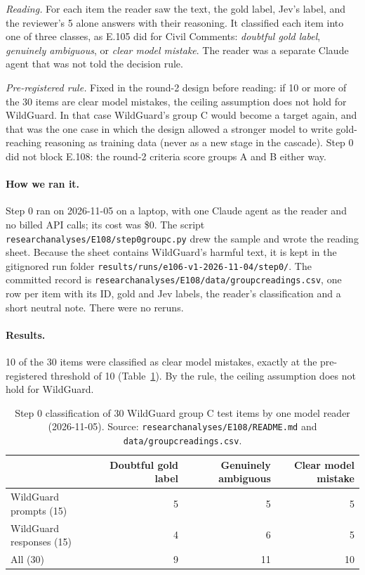 \documentclass[11pt]{article}
\renewcommand{\_}{\origunderscore\allowbreak}
\begin{document}
\emph{Reading.} For each item the reader saw the text, the gold label, Jev's label, and the reviewer's 5 alone answers with their reasoning. It classified each item into one of three classes, as E.105 did for Civil Comments: \emph{doubtful gold label}, \emph{genuinely ambiguous}, or \emph{clear model mistake}. The reader was a separate Claude agent that was not told the decision rule.

\emph{Pre-registered rule.} Fixed in the round-2 design before reading: if 10 or more of the 30 items are clear model mistakes, the ceiling assumption does not hold for WildGuard. In that case WildGuard's group C would become a target again, and that was the one case in which the design allowed a stronger model to write gold-reaching reasoning as training data (never as a new stage in the cascade). Step 0 did not block E.108: the round-2 criteria score groups A and B either way.

\paragraph{How we ran it.}
Step 0 ran on 2026-11-05 on a laptop, with one Claude agent as the reader and no billed API calls; its cost was \$0. The script \texttt{research\_analyses/E108/step0\_group\_c.py} drew the sample and wrote the reading sheet. Because the sheet contains WildGuard's harmful text, it is kept in the gitignored run folder \texttt{results/runs/e106-v1-2026-11-04/step0/}. The committed record is \texttt{research\_analyses/E108/data/group\_c\_readings.csv}, one row per item with its ID, gold and Jev labels, the reader's classification and a short neutral note. There were no reruns.

\paragraph{Results.}
10 of the 30 items were classified as clear model mistakes, exactly at the pre-registered threshold of 10 (Table~\ref{tab:step0-readings}). By the rule, the ceiling assumption does not hold for WildGuard.

\begin{table}[H]
\centering
\small
\caption{Step 0 classification of 30 WildGuard group C test items by one model reader (2026-11-05). Source: \texttt{research\_analyses/E108/README.md} and \texttt{data/group\_c\_readings.csv}.}
\label{tab:step0-readings}
\begin{tabular}{lrrr}
\toprule
 & Doubtful gold label & Genuinely ambiguous & Clear model mistake \\
\midrule
WildGuard prompts (15) & 5 & 5 & 5 \\
WildGuard responses (15) & 4 & 6 & 5 \\
\midrule
All (30) & 9 & 11 & 10 \\
\bottomrule
\end{tabular}
\end{table}
\end{document}
